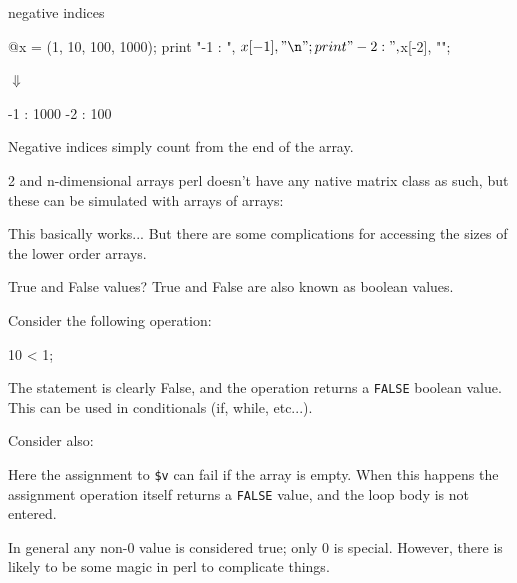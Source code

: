 \documentclass[pdf]{beamer}
\begin{document}
\begin{frame}[fragile]{negative indices}
  \begin{perlcode}
  @x = (1, 10, 100, 1000);
  print "-1 : ", $x[-1], "\n";
  print "-2 : ", $x[-2], "\n";
  \end{perlcode}
  
  \hspace{1cm} $\Downarrow$

  \begin{consolecode}
  -1 : 1000
  -2 : 100
  \end{consolecode}
  
  Negative indices simply count from the end of the array.
\end{frame}

\begin{frame}[fragile]{2 and n-dimensional arrays}
  perl doesn't have any native matrix class as such, but these can be
  simulated with arrays of arrays:


  This basically works... But there are some complications for accessing the
  sizes of the lower order arrays.
\end{frame}

\begin{frame}[fragile]{True and False values?}
  True and False are also known as boolean values.
  
  Consider the following operation:
  \begin{perlcode}
    10 < 1;
  \end{perlcode}

  The statement is clearly False, and the operation returns a \texttt{FALSE}
  boolean value. This can be used in conditionals (if, while, etc...).

  Consider also:
  
  Here the assignment to \verb|$v| can fail if the array is empty. When this
  happens the assignment operation itself returns a \texttt{FALSE} value, and
  the loop body is not entered.

  In general any non-0 value is considered true; only 0 is special. However,
  there is likely to be some magic in perl to complicate things.
\end{frame}
\end{document}
